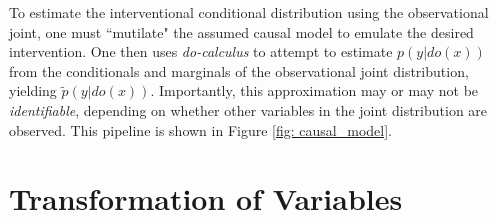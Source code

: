 To estimate the interventional conditional distribution using the observational joint, one must ``mutilate" the assumed causal model to emulate the desired intervention. One then uses \textit{do-calculus} to attempt to estimate $p(y | do(x))$ from the conditionals and marginals of the observational joint distribution, yielding $\tilde{p}(y | do(x))$. Importantly, this approximation may or may not be \textit{identifiable}, depending on whether other variables in the joint distribution are observed. This pipeline is shown in Figure \ref{fig: causal_model}.


\section{Transformation of Variables}
\label{sec: transformation of variables}

